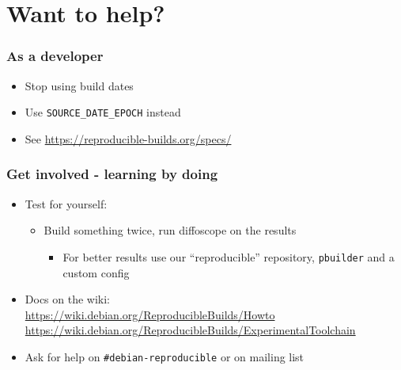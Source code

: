 \documentclass[14pt,aspectratio=169]{beamer}
\begin{document}
\section{Want to help?}

\begin{frame}
 \frametitle{As a developer}
 \begin{itemize}
  \item Stop using build dates
  \item Use \texttt{SOURCE\_DATE\_EPOCH} instead
  \item See \url{https://reproducible-builds.org/specs/}
 \end{itemize}
\end{frame}

\begin{frame}
 \frametitle{Get involved - learning by doing}

 \begin{itemize}
  \item Test for yourself:
   \begin{itemize}
    \item Build something twice, run diffoscope on the results
    \begin{itemize}
     \item For better results use our “reproducible” repository, \texttt{pbuilder} and a custom config
    \end{itemize}
   \end{itemize}
  \item Docs on the wiki: \\
    \small{\url{https://wiki.debian.org/ReproducibleBuilds/Howto}} \\
    \small{\url{https://wiki.debian.org/ReproducibleBuilds/ExperimentalToolchain}}
  \item Ask for help on \texttt{\#debian-reproducible} or on mailing list
 \end{itemize}
\end{frame}
\end{document}
